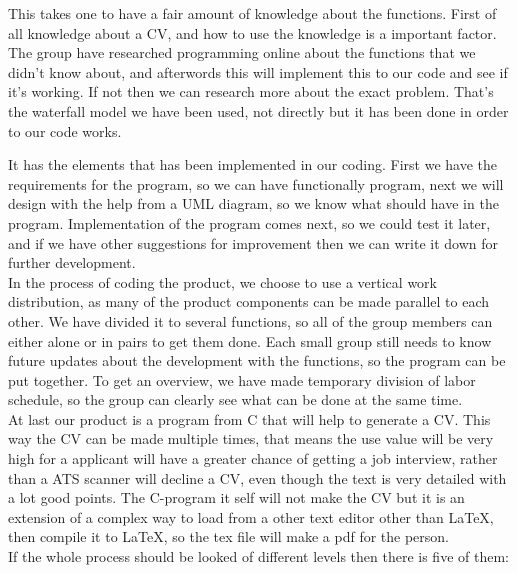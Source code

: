 This takes one to have a fair amount of knowledge about the functions.
First of all knowledge about a CV, and how to use the knowledge is a important factor.
The group have researched programming online about the functions that we didn't know about, 
and afterwords this will implement this to our code and see if it's working. If not then we can research more about the exact problem.
That's the waterfall model we have been used, not directly but it has been done in order to our code works.

It has the elements that has been implemented in our coding. First we have the requirements for the program, 
so we can have functionally program, next we will design with the help from a UML diagram, 
so we know what should have in the program. Implementation of the program comes next, so we could test it later, 
and if we have other suggestions for improvement then we can write it down for further development.\\

In the process of coding the product, we choose to use a vertical work distribution, as many of the product
components can be made parallel to each other. We have divided it to several functions, 
so all of the group members can either alone or in pairs to get them done.
Each small group still needs to know future updates about the development with the functions, so the program can be put together.
To get an overview, we have made temporary division of labor
schedule, so the group can clearly see what can be done at the same time. \\

At last our product is a program from C that will help to generate a CV. This way the CV can be made multiple times,
that means the use value will be very high for a applicant will have a greater chance of getting a job interview,
rather than a ATS scanner will decline a CV, even though the text is very detailed with a lot good points.
The C-program it self will not make the CV but it is an extension of a complex way to load from a other text editor
other than LaTeX, then compile it to LaTeX, so the tex file will make a pdf for the person.\\

If the whole process should be looked of different levels then there is five of them:

